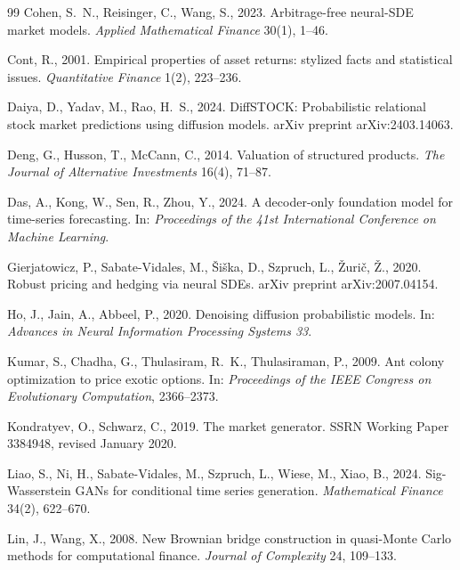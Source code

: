 ﻿\documentclass[12pt,letterpaper]{article}
\begin{document}
\begin{thebibliography}{99}
Cohen, S.~N., Reisinger, C., Wang, S., 2023. Arbitrage-free neural-SDE
market models. \emph{Applied Mathematical Finance} 30(1), 1--46.

Cont, R., 2001. Empirical properties of asset returns: stylized facts and
statistical issues. \emph{Quantitative Finance} 1(2), 223--236.

Daiya, D., Yadav, M., Rao, H.~S., 2024. DiffSTOCK: Probabilistic relational
stock market predictions using diffusion models. arXiv preprint
arXiv:2403.14063.

Deng, G., Husson, T., McCann, C., 2014. Valuation of structured products.
\emph{The Journal of Alternative Investments} 16(4), 71--87.

Das, A., Kong, W., Sen, R., Zhou, Y., 2024. A decoder-only foundation model
for time-series forecasting. In: \emph{Proceedings of the 41st International
Conference on Machine Learning}.

Gierjatowicz, P., Sabate-Vidales, M., \v{S}i\v{s}ka, D., Szpruch, L.,
\v{Z}uri\v{c}, \v{Z}., 2020. Robust pricing and hedging via neural SDEs.
arXiv preprint arXiv:2007.04154.

Ho, J., Jain, A., Abbeel, P., 2020. Denoising diffusion probabilistic
models. In: \emph{Advances in Neural Information Processing Systems 33}.

Kumar, S., Chadha, G., Thulasiram, R.~K., Thulasiraman, P., 2009. Ant colony
optimization to price exotic options. In: \emph{Proceedings of the IEEE
Congress on Evolutionary Computation}, 2366--2373.

Kondratyev, O., Schwarz, C., 2019. The market generator. SSRN Working Paper
3384948, revised January 2020.

Liao, S., Ni, H., Sabate-Vidales, M., Szpruch, L., Wiese, M., Xiao, B., 2024.
Sig-Wasserstein GANs for conditional time series generation.
\emph{Mathematical Finance} 34(2), 622--670.

Lin, J., Wang, X., 2008. New Brownian bridge construction in quasi-Monte
Carlo methods for computational finance. \emph{Journal of Complexity} 24,
109--133.


\end{thebibliography}
\end{document}
